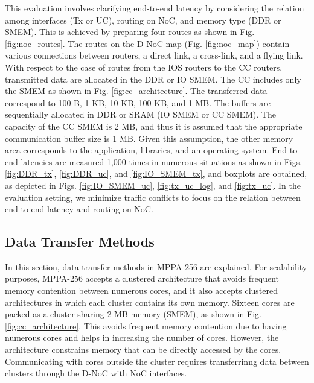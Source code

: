 This evaluation involves clarifying end-to-end latency by considering the relation among interfaces (Tx or UC), routing on NoC, and memory type (DDR or SMEM).
This is achieved by preparing four routes as shown in Fig. \ref{fig:noc_routes}.
The routes on the D-NoC map (Fig. \ref{fig:noc_map}) contain various connections between routers, a direct link, a cross-link, and a flying link.
With respect to the case of routes from the IOS routers to the CC routers, transmitted data are allocated in the DDR or IO SMEM.
The CC includes only the SMEM as shown in Fig. \ref{fig:cc_architecture}.
The transferred data correspond to 100 B, 1 KB, 10 KB, 100 KB, and 1 MB.
The buffers are sequentially allocated in DDR or SRAM (IO SMEM or CC SMEM).
The capacity of the CC SMEM is 2 MB, and thus it is assumed that the appropriate communication buffer size is 1 MB.
Given this assumption, the other memory area corresponds to the application, libraries, and an operating system.
End-to-end latencies are measured 1,000 times in numerous situations as shown in Figs. \ref{fig:DDR_tx}, \ref{fig:DDR_uc}, and \ref{fig:IO_SMEM_tx}, and boxplots are obtained, as depicted in Figs. \ref{fig:IO_SMEM_uc}, \ref{fig:tx_uc_log}, and \ref{fig:tx_uc}.
In the evaluation setting, we minimize traffic conflicts to focus on the relation between end-to-end latency and routing on NoC.



\subsection{Data Transfer Methods}
\label{sec:data_transfer_methods}

In this section, data transfer methods in MPPA-256 are explained.
For scalability purposes, MPPA-256 accepts a clustered architecture that avoids frequent memory contention between numerous cores, and it also accepts clustered architectures in which each cluster contains its own memory.
Sixteen cores are packed as a cluster sharing 2 MB memory (SMEM), as shown in Fig. \ref{fig:cc_architecture}.
This avoids frequent memory contention due to having numerous cores and helps in increasing the number of cores.
However, the architecture constrains memory that can be directly accessed by the cores.
Communicating with cores outside the cluster requires transferrinng data between clusters through the D-NoC with NoC interfaces.

